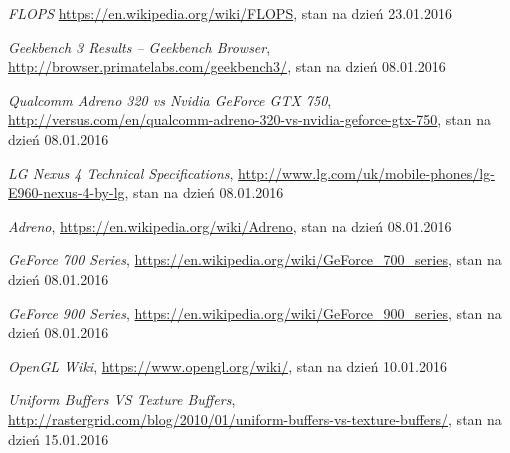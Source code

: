 \begin{thebibliography}{999}
 \emph{FLOPS} \href{https://en.wikipedia.org/wiki/FLOPS}{https://en.wikipedia.org/wiki/FLOPS}, stan na dzień 23.01.2016

 \emph{Geekbench 3 Results -- Geekbench Browser}, \href{http://browser.primatelabs.com/geekbench3/}{http://browser.primatelabs.com/geekbench3/}, stan na dzień 08.01.2016

 \emph{Qualcomm Adreno 320 vs Nvidia GeForce GTX 750}, \href{http://versus.com/en/qualcomm-adreno-320-vs-nvidia-geforce-gtx-750}{http://versus.com/en/\allowbreak{}qualcomm-adreno-320-vs-nvidia-geforce-gtx-750}, stan na dzień 08.01.2016

 \emph{LG Nexus 4 Technical Specifications}, \href{http://www.lg.com/uk/mobile-phones/lg-E960-nexus-4-by-lg}{http://www.lg.com/uk/mobile-phones/lg-E960-\allowbreak{}nexus-4-by-lg}, stan na dzień 08.01.2016

 \emph{Adreno}, \href{https://en.wikipedia.org/wiki/Adreno}{https://en.wikipedia.org/wiki/Adreno}, stan na dzień 08.01.2016

 \emph{GeForce 700 Series}, \href{https://en.wikipedia.org/wiki/GeForce_700_series}{https://en.wikipedia.org/wiki/GeForce\_700\_series}, stan na dzień 08.01.2016

 \emph{GeForce 900 Series}, \href{https://en.wikipedia.org/wiki/GeForce_900_series}{https://en.wikipedia.org/wiki/GeForce\_900\_series}, stan na dzień 08.01.2016

 \emph{OpenGL Wiki}, \href{https://www.opengl.org/wiki/}{https://www.opengl.org/wiki/}, stan na dzień 10.01.2016

 \emph{Uniform Buffers VS Texture Buffers}, \href{http://rastergrid.com/blog/2010/01/uniform-buffers-vs-texture-buffers/}{http://rastergrid.com/blog/2010/01/uniform-buffers\allowbreak{}-vs-texture-buffers/}, stan na dzień 15.01.2016

\end{thebibliography}
